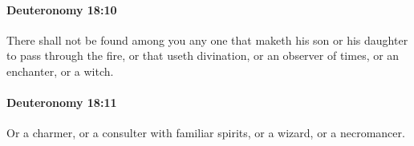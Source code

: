 		\paragraph{Deuteronomy 18:10} %
			\label{DEUTERONOMY-18-10}

			There shall not be found among you any one that maketh his son or his daughter to pass through the fire, or that useth divination, or an observer of times, or an enchanter, or a witch.


		\paragraph{Deuteronomy 18:11} %
			\label{DEUTERONOMY-18-11}

			Or a charmer, or a consulter with familiar spirits, or a wizard, or a necromancer.


